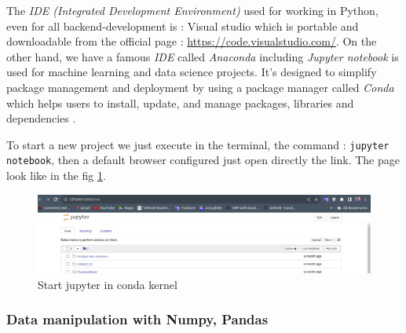 \documentclass[12pt,a4paper]{report}
\begin{document}
The \textit{IDE (Integrated Development Environment)} used for working in Python, even for all backend-development is : Visual studio which is portable and downloadable from the official page : \url{https://code.visualstudio.com/}.  On the other hand, we have a famous \textit{IDE} called \textit{Anaconda} including \textit{Jupyter notebook} is used for machine learning and data science projects. It's designed to simplify package management and deployment by using a package manager called \textit{Conda} which helps users to install, update, and manage packages, libraries and dependencies \cite{teimourzadeh2022application}.

To start a new project we just execute in the terminal, the command :  \texttt{jupyter notebook}, then a default browser configured just open directly the link. The page look like in the fig \ref{fig:jupyteropen}.
\begin{figure}
	\centering
	\includegraphics[width=1\linewidth]{jupyterOpen}
	\caption{Start jupyter in conda kernel}
	\label{fig:jupyteropen}
\end{figure}  

\subsubsection{{\large Data manipulation with Numpy, Pandas}}
 
\end{document}
